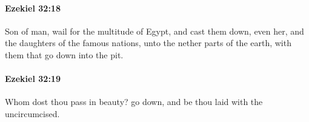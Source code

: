 		\paragraph{Ezekiel 32:18} %
			\label{EZEKIEL-32-18}

			Son of man, wail for the multitude of Egypt, and cast them down, even her, and the daughters of the famous nations, unto the nether parts of the earth, with them that go down into the pit.


		\paragraph{Ezekiel 32:19} %
			\label{EZEKIEL-32-19}

			Whom dost thou pass in beauty? go down, and be thou laid with the uncircumcised.



